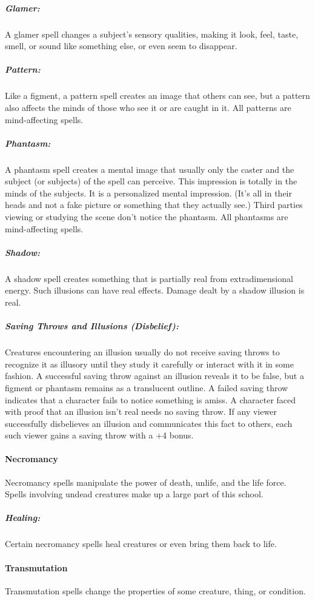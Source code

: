 \documentclass[../VancianToPsionics.tex]{subfiles}
\begin{document}
\subparagraph{Glamer:}
A glamer spell changes a subject's sensory qualities, making it look, feel, taste, smell, or sound like something else, or even seem to disappear.

\subparagraph{Pattern:}
Like a figment, a pattern spell creates an image that others can see, but a pattern also affects the minds of those who see it or are caught in it. 
All patterns are mind-affecting spells.

\subparagraph{Phantasm:}
A phantasm spell creates a mental image that usually only the caster and the subject (or subjects) of the spell can perceive. 
This impression is totally in the minds of the subjects. It is a personalized mental impression. (It's all in their heads and not a fake picture or something that they actually see.) 
Third parties viewing or studying the scene don't notice the phantasm. All phantasms are mind-affecting spells.

\subparagraph{Shadow:}
A shadow spell creates something that is partially real from extradimensional energy. 
Such illusions can have real effects. Damage dealt by a shadow illusion is real.

\subparagraph{Saving Throws and Illusions (Disbelief):}
Creatures encountering an illusion usually do not receive saving throws to recognize 
it as illusory until they study it carefully or interact with it in some fashion.
A successful saving throw against an illusion reveals it to be false, 
but a figment or phantasm remains as a translucent outline.
A failed saving throw indicates that a character fails to notice something is amiss. 
A character faced with proof that an illusion isn't real needs no saving throw. 
If any viewer successfully disbelieves an illusion and communicates this fact to others, 
each such viewer gains a saving throw with a +4 bonus.

\paragraph{Necromancy}
Necromancy spells manipulate the power of death, unlife, and the life force. 
Spells involving undead creatures make up a large part of this school.

\subparagraph{Healing:}
Certain necromancy spells heal creatures or even bring them back to life.
\paragraph{Transmutation}
Transmutation spells change the properties of some creature, thing, or condition.
\end{document}
